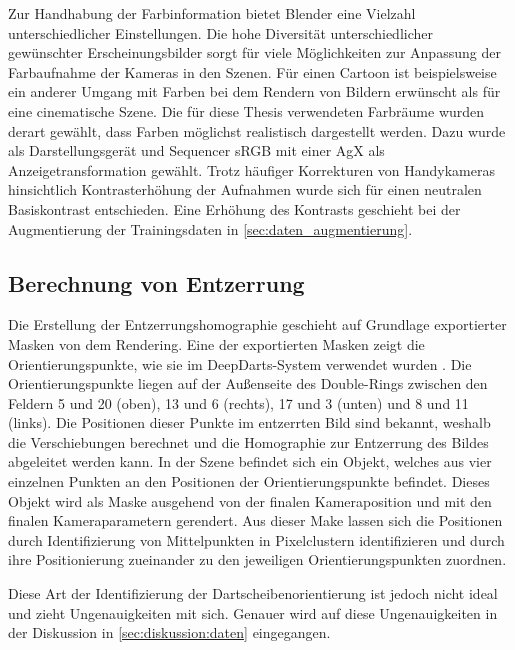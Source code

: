 Zur Handhabung der Farbinformation bietet Blender eine Vielzahl unterschiedlicher Einstellungen. Die hohe Diversität unterschiedlicher gewünschter Erscheinungsbilder sorgt für viele Möglichkeiten zur Anpassung der Farbaufnahme der Kameras in den Szenen. Für einen Cartoon ist beispielsweise ein anderer Umgang mit Farben bei dem Rendern von Bildern erwünscht als für eine cinematische Szene. Die für diese Thesis verwendeten Farbräume wurden derart gewählt, dass Farben möglichst realistisch dargestellt werden. Dazu wurde als Darstellungsgerät und Sequencer sRGB mit einer AgX als Anzeigetransformation gewählt. Trotz häufiger Korrekturen von Handykameras hinsichtlich Kontrasterhöhung der Aufnahmen wurde sich für einen neutralen Basiskontrast entschieden. Eine Erhöhung des Kontrasts geschieht bei der Augmentierung der Trainingsdaten in \autoref{sec:daten_augmentierung}.

\subsection{Berechnung von Entzerrung}  %
\label{sec:berechnung_entzerrung}

Die Erstellung der Entzerrungshomographie geschieht auf Grundlage exportierter Masken von dem Rendering. Eine der exportierten Masken zeigt die Orientierungspunkte, wie sie im DeepDarts-System verwendet wurden \cite{deepdarts}. Die Orientierungspunkte liegen auf der Außenseite des Double-Rings zwischen den Feldern 5 und 20 (oben), 13 und 6 (rechts), 17 und 3 (unten) und 8 und 11 (links). Die Positionen dieser Punkte im entzerrten Bild sind bekannt, weshalb die Verschiebungen berechnet und die Homographie zur Entzerrung des Bildes abgeleitet werden kann. In der Szene befindet sich ein Objekt, welches aus vier einzelnen Punkten an den Positionen der Orientierungspunkte befindet. Dieses Objekt wird als Maske ausgehend von der finalen Kameraposition und mit den finalen Kameraparametern gerendert. Aus dieser Make lassen sich die Positionen durch Identifizierung von Mittelpunkten in Pixelclustern identifizieren und durch ihre Positionierung zueinander zu den jeweiligen Orientierungspunkten zuordnen.

Diese Art der Identifizierung der Dartscheibenorientierung ist jedoch nicht ideal und zieht Ungenauigkeiten mit sich. Genauer wird auf diese Ungenauigkeiten in der Diskussion in \autoref{sec:diskussion:daten} eingegangen.

